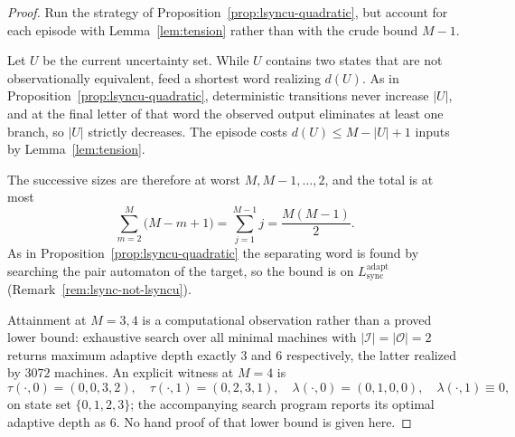 \documentclass[12pt]{article}
\theoremstyle{definition}
\newcommand{\Lsync}{L_{\mathrm{sync}}^{\mathrm{adapt}}}
\begin{document}
\begin{proof}
Run the strategy of Proposition~\ref{prop:lsyncu-quadratic}, but account for
each episode with Lemma~\ref{lem:tension} rather than with the crude bound
$M-1$.

Let $U$ be the current uncertainty set.  While $U$ contains two states that
are not observationally equivalent, feed a shortest word realizing $d(U)$.  As
in Proposition~\ref{prop:lsyncu-quadratic}, deterministic transitions never
increase $|U|$, and at the final letter of that word the observed output
eliminates at least one branch, so $|U|$ strictly decreases.  The episode costs
$d(U)\le M-|U|+1$ inputs by Lemma~\ref{lem:tension}.

The successive sizes are therefore at worst $M,M-1,\dots,2$, and the total is
at most
\[
\sum_{m=2}^{M}\bigl(M-m+1\bigr)
=
\sum_{j=1}^{M-1}j
=
\frac{M(M-1)}{2}.
\]
As in Proposition~\ref{prop:lsyncu-quadratic} the separating word is found by
searching the pair automaton of the target, so the bound is on $\Lsync$
(Remark~\ref{rem:lsync-not-lsyncu}).

Attainment at $M=3,4$ is a computational observation rather than a proved
lower bound: exhaustive search over all minimal machines with
$|\mathcal I|=|\mathcal O|=2$ returns maximum adaptive depth exactly $3$ and
$6$ respectively, the latter realized by $3072$ machines.  An explicit witness
at $M=4$ is
\[
\tau(\cdot,0)=(0,0,3,2),\quad
\tau(\cdot,1)=(0,2,3,1),\quad
\lambda(\cdot,0)=(0,1,0,0),\quad
\lambda(\cdot,1)\equiv0 ,
\]
on state set $\{0,1,2,3\}$; the accompanying search program reports its optimal
adaptive depth as $6$.  No hand proof of that lower bound is given here.
\end{proof}
\end{document}
